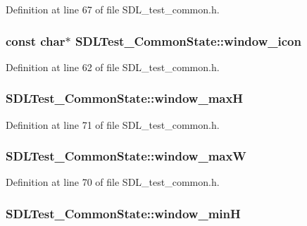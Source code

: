 Definition at line 67 of file S\-D\-L\-\_\-test\-\_\-common.\-h.

\hypertarget{struct_s_d_l_test___common_state_ac9e981b2b60a59f995153c74242d9d43}{
\subsubsection[{window\-\_\-icon}]{\setlength{\rightskip}{0pt plus 5cm}const char$\ast$ S\-D\-L\-Test\-\_\-\-Common\-State\-::window\-\_\-icon}}\label{struct_s_d_l_test___common_state_ac9e981b2b60a59f995153c74242d9d43}


Definition at line 62 of file S\-D\-L\-\_\-test\-\_\-common.\-h.

\hypertarget{struct_s_d_l_test___common_state_a0f792d6f2c15c60567bc4641e9f44f70}{
\subsubsection[{window\-\_\-max\-H}]{ S\-D\-L\-Test\-\_\-\-Common\-State\-::window\-\_\-max\-H}}\label{struct_s_d_l_test___common_state_a0f792d6f2c15c60567bc4641e9f44f70}


Definition at line 71 of file S\-D\-L\-\_\-test\-\_\-common.\-h.

\hypertarget{struct_s_d_l_test___common_state_acecd147641f8d6a0f137e669bbe5c48b}{
\subsubsection[{window\-\_\-max\-W}]{ S\-D\-L\-Test\-\_\-\-Common\-State\-::window\-\_\-max\-W}}\label{struct_s_d_l_test___common_state_acecd147641f8d6a0f137e669bbe5c48b}


Definition at line 70 of file S\-D\-L\-\_\-test\-\_\-common.\-h.

\hypertarget{struct_s_d_l_test___common_state_a918001b474c4ca034db3e1aba96df7c1}{
\subsubsection[{window\-\_\-min\-H}]{ S\-D\-L\-Test\-\_\-\-Common\-State\-::window\-\_\-min\-H}}\label{struct_s_d_l_test___common_state_a918001b474c4ca034db3e1aba96df7c1}


